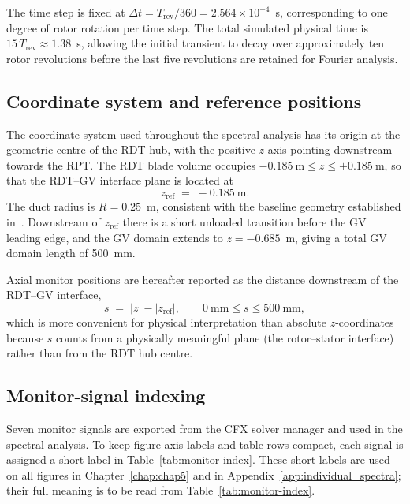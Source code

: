 The time step is fixed at $\Delta t = T_{\mathrm{rev}}/360 = 2.564\times 10^{-4}$~s, corresponding to one degree of rotor rotation per time step. The total simulated physical time is $15\,T_{\mathrm{rev}} \approx 1.38$~s, allowing the initial transient to decay over approximately ten rotor revolutions before the last five revolutions are retained for Fourier analysis.
 
\subsection{Coordinate system and reference positions}
\label{sec:coord-system}
 
The coordinate system used throughout the spectral analysis has its origin at the geometric centre of the RDT hub, with the positive $z$-axis pointing downstream towards the RPT. The RDT blade volume occupies $-0.185~\mathrm{m} \leq z \leq +0.185~\mathrm{m}$, so that the RDT--GV interface plane is located at
\begin{equation}
    z_{\mathrm{ref}} \;=\; -0.185~\mathrm{m}. \label{eq:zref}
\end{equation}
The duct radius is $R = 0.25$~m, consistent with the baseline geometry established in~\cite{Leonsen2025}. Downstream of $z_{\mathrm{ref}}$ there is a short unloaded transition before the GV leading edge, and the GV domain extends to $z = -0.685$~m, giving a total GV domain length of 500~mm.
 
Axial monitor positions are hereafter reported as the distance downstream of the RDT--GV interface,
\begin{equation}
    s \;=\; |z| - |z_{\mathrm{ref}}|,
    \qquad 0~\mathrm{mm} \leq s \leq 500~\mathrm{mm},
\end{equation}
which is more convenient for physical interpretation than absolute $z$-coordinates because $s$ counts from a physically meaningful plane (the rotor--stator interface) rather than from the RDT hub centre.
 
\subsection{Monitor-signal indexing}
\label{sec:monitor-index}
 
Seven monitor signals are exported from the CFX solver manager and used in the spectral analysis. To keep figure axis labels and table rows compact, each signal is assigned a short label in Table~\ref{tab:monitor-index}. These short labels are used on all figures in Chapter~\ref{chap:chap5} and in Appendix~\ref{app:individual_spectra}; their full meaning is to be read from Table~\ref{tab:monitor-index}.
 
